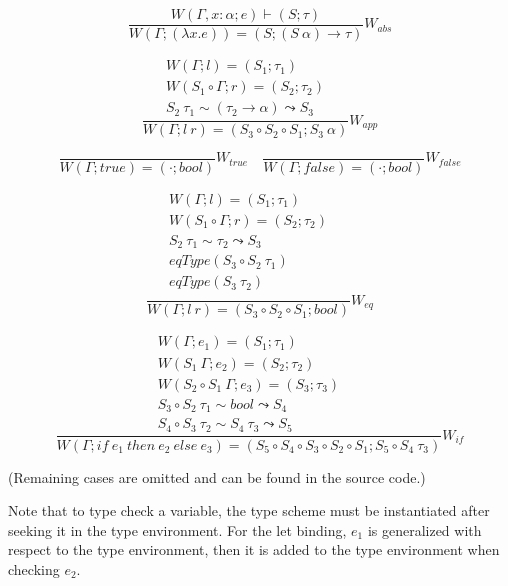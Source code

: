 \documentclass[a4paper]{article}
\begin{document}
\[
    \frac{W(\Gamma, x:\alpha; e) \vdash (S; \tau)}{W(\Gamma; (\lambda x.e)) = (S; (S\ \alpha) \to \tau)}W_{abs}
\]

\[
    \frac{
        \begin{array}{c}
            W(\Gamma; l)=(S_1;\tau_1)           \\
            W(S_1 \circ \Gamma; r)=(S_2;\tau_2) \\
            S_2\ \tau_1 \sim (\tau_2 \to \alpha) \leadsto S_3
        \end{array}
    }
    {W(\Gamma; l\ r) = (S_3 \circ S_2 \circ S_1; S_3\ \alpha)}W_{app}
\]

\[
    \frac{}{W(\Gamma; true) = (\cdot; bool)}W_{true} \quad
    \frac{}{W(\Gamma; false) = (\cdot; bool)}W_{false}
\]

\[
    \frac{
        \begin{array}{c}
            W(\Gamma; l) = (S_1; \tau_1)           \\
            W(S_1 \circ \Gamma; r) = (S_2; \tau_2) \\
            S_2\ \tau_1 \sim \tau_2 \leadsto S_3   \\
            eqType (S_3 \circ S_2\ \tau_1)         \\
            eqType (S_3\ \tau_2)                   \\
        \end{array}
    }{W(\Gamma; l\ r) = (S_3 \circ S_2 \circ S_1; bool)}W_{eq}
\]

\[
    \frac{
        \begin{array}{c}
            W(\Gamma; e_1) = (S_1; \tau_1)                \\
            W(S_1\ \Gamma; e_2) = (S_2; \tau_2)           \\
            W(S_2 \circ S_1\ \Gamma; e_3) = (S_3; \tau_3) \\
            S_3 \circ S_2\ \tau_1 \sim bool \leadsto S_4  \\
            S_4 \circ S_3\ \tau_2 \sim S_4\ \tau_3 \leadsto S_5
        \end{array}
    }{W(\Gamma; if\ e_1\ then\ e_2\ else\ e_3) = (S_5 \circ S_4 \circ S_3 \circ S_2 \circ S_1; S_5 \circ S_4\ \tau_3)}W_{if}
\]

\begin{center}
    (Remaining cases are omitted and can be found in the source code.)
\end{center}

Note that to type check a variable, the type scheme must be instantiated after seeking it in the type environment. For the let binding, $e_1$ is generalized with respect to the type environment, then it is added to the type environment when checking $e_2$.
\end{document}
